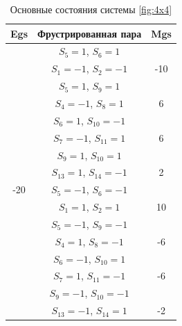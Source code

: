\documentclass[utf8, babel, sor, jor, amsmath, amssymb, reprint]{elsarticle} %
\begin{document}
\begin{table}[H]
	\centering
	\begin{tabular}{|c|c|c|}
		\hline
		Egs   &   Фрустрированная пара & Mgs \\
		\hline
		  &  $S_5=1$, $S_6=1$& \\
		&    $S_1=-1$, $S_2=-1$ & -10\\
		\cline{2-3}
		   &  $S_5=1$, $S_9=1$& \\
		&    $S_4=-1$, $S_8=1$& 6\\
			\cline{2-3}
		  &  $S_6=1$, $S_{10}=-1$&\\
		&    $S_7=-1$, $S_{11}=1$& 6\\
		\cline{2-3}
		   &  $S_9=1$, $S_{10}=1$&\\
		&    $S_{13}=1$, $S_{14}=-1$& 2\\
		\cline{2-3}
		-20	\multirow{3}{*}{}
		  &  $S_5=-1$, $S_6=-1$&\\
		&    $S_1=1$, $S_2=1$& 10\\
		\cline{2-3}
		  &  $S_5=-1$, $S_9=-1$&\\
		&    $S_4=1$, $S_8=-1$& -6\\
		\cline{2-3}
		   &  $S_6=-1$, $S_{10}=1$&\\
		&    $S_7=1$, $S_{11}=-1$& -6\\
			\cline{2-3}
		  &  $S_9=-1$, $S_{10}=-1$&\\
		&    $S_{13}=-1$, $S_{14}=1$& -2\\
		\hline
	\end{tabular}
	\caption{Основные состояния системы \ref{fig:4x4}}
	\label{tab:gs_4x4}
\end{table}
\end{document}
